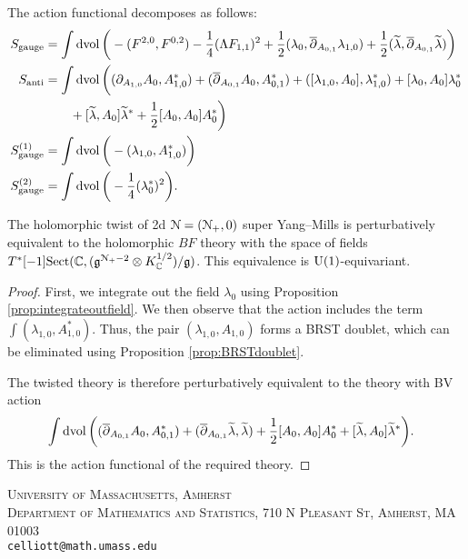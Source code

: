 \documentclass[10pt, oneside]{article}
\begin{document}
The action functional decomposes as follows:
\begin{align*}
S_{\mathrm{gauge}} &= \int \operatorname{dvol} \bigg(-(F^{2, 0}, F^{0, 2}) - \frac{1}{4}(\Lambda F_{1, 1})^2 + \frac 12 (\lambda_0 , \overline{\partial}_{A_{0,1}} \lambda_{1,0}) + \frac 12 (\widetilde{\lambda}, \overline{\partial}_{A_{0,1}} \widetilde{\lambda}) \bigg)    \\
S_{\mathrm{anti}} &= \int \operatorname{dvol} \bigg( (\partial_{A_{1, 0}} A_0 , A_{1,0}^*) + (\overline{\partial}_{A_{0, 1}} A_0, A_{0,1}^*) + ([\lambda_{1,0}, A_0], \lambda_{1,0}^*) +  [\lambda_{0}, A_0] \lambda_{0}^*\\
&\qquad + [\widetilde{\lambda}, A_0] \widetilde{\lambda}^* + \frac{1}{2}[A_0, A_0]A_0^* \bigg) \\
S^{(1)}_{\mathrm{gauge}} &=  \int \operatorname{dvol} \bigg( - (\lambda_{1,0}, A_{1,0}^*) \bigg) \\
S^{(2)}_{\mathrm{gauge}} &= \int \operatorname{dvol} \bigg( -\frac{1}{4} (\lambda_0^*)^2 \bigg) .
\end{align*}

\begin{theorem} \label{thm:2d(N,0)}
The holomorphic twist of 2d $\mathcal N=(\mathcal N_+,0)$ super Yang--Mills is perturbatively equivalent to the holomorphic $BF$ theory with the space of fields $T^*[-1]\mathrm{Sect}(\mathbb C, (\mathfrak g^{\mathcal{N}_+ -2} \otimes K_{\mathbb C}^{1/2}) / \mathfrak{g})$. This equivalence is $\mathrm{U}(1)$-equivariant.
\end{theorem}

\begin{proof}
First, we integrate out the field $\lambda_{0}$ using Proposition \ref{prop:integrateoutfield}.   
We then observe that the action includes the term $\int  (\lambda_{1,0} , A_{1,0}^*)$.
Thus, the pair $(\lambda_{1,0}, A_{1,0})$ forms a BRST doublet, 
which can be eliminated using Proposition \ref{prop:BRSTdoublet}.  

The twisted theory is therefore perturbatively equivalent to the theory with BV action 
\begin{align*}
& \int \operatorname{dvol} \bigg((\overline{\partial}_{A_{0,1}} A_{0}, A_{0,1}^*) + (\overline{\partial}_{A_{0,1}} \widetilde{\lambda} ,  \widetilde{\lambda}) + \frac{1}{2}[A_0, A_0]A_0^*+ [ \widetilde{\lambda} , A_0]  \widetilde{\lambda}^* \bigg).
\end{align*}
This is the action functional of the required theory.
\end{proof}

\pagestyle{bib}
\printbibliography

\textsc{University of Massachusetts, Amherst}\\
\textsc{Department of Mathematics and Statistics, 710 N Pleasant St, Amherst, MA 01003}\\
\texttt{celliott@math.umass.edu}\\
\vspace{-5pt}
\end{document}
